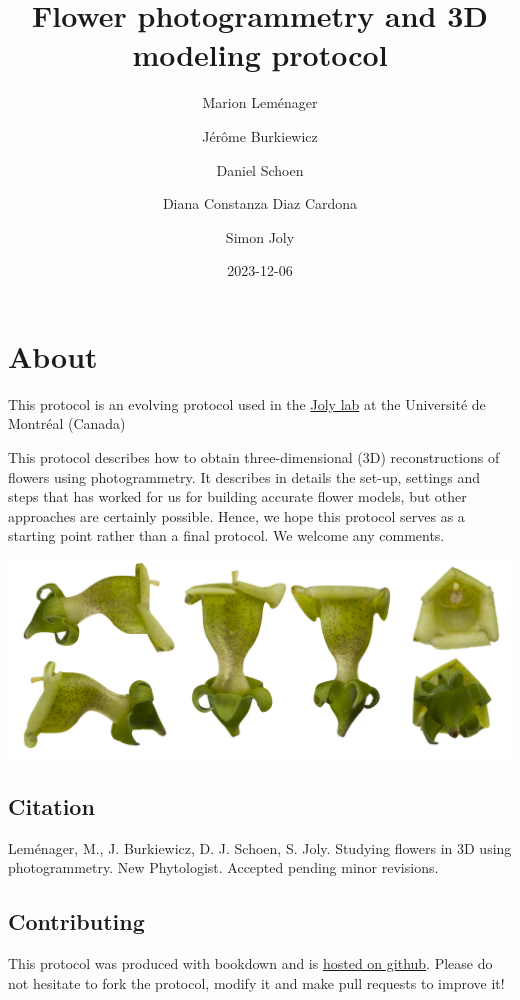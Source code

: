 \documentclass[
]{book}
\title{Flower photogrammetry and 3D modeling protocol}
\author{Marion Leménager \and Jérôme Burkiewicz \and Daniel Schoen \and Diana Constanza Diaz Cardona \and Simon Joly}
\date{2023-12-06}
\begin{document}
\maketitle

{
\setcounter{tocdepth}{1}
\tableofcontents
}
\hypertarget{about}{%
\chapter{About}\label{about}}

This protocol is an evolving protocol used in the \href{www.plantevolution.org}{Joly lab} at the Université de Montréal (Canada)

This protocol describes how to obtain three-dimensional (3D) reconstructions of flowers using photogrammetry. It describes in details the set-up, settings and steps that has worked for us for building accurate flower models, but other approaches are certainly possible. Hence, we hope this protocol serves as a starting point rather than a final protocol. We welcome any comments.

\includegraphics[width=1\textwidth,height=\textheight]{Figures/cover.jpg}

\hypertarget{citation}{%
\section{Citation}\label{citation}}

Leménager, M., J. Burkiewicz, D. J. Schoen, S. Joly. Studying flowers in 3D using photogrammetry. New Phytologist. Accepted pending minor revisions.

\hypertarget{contributing}{%
\section{Contributing}\label{contributing}}

This protocol was produced with bookdown and is \href{https://github.com/plantevolution/photogrammetry-protocol}{hosted on github}. Please do not hesitate to fork the protocol, modify it and make pull requests to improve it!
\end{document}
